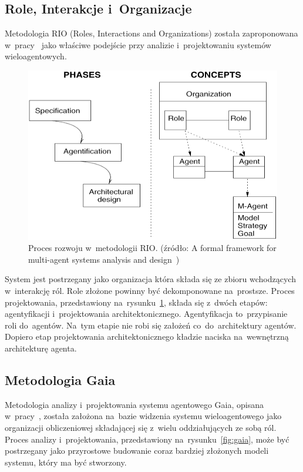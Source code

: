 \documentclass[11pt]{report}
\begin{document}
    \subsection{Role, Interakcje i~Organizacje}
    Metodologia RIO (Roles, Interactions and Organizations) została zaproponowana w~pracy~\cite{S095741740200070220020101} jako właściwe podejście przy analizie
    i~projektowaniu systemów wieloagentowych.

    \begin{figure}[!ht]
        \centering
        \includegraphics[width=\linewidth]{fig/RIO approach.png}
        \caption{Proces rozwoju w~metodologii RIO. (źródło: A formal framework for multi-agent systems analysis and design~\cite{S095741740200070220020101})}
        \label{fig:rio}
    \end{figure}

    System jest postrzegany jako organizacja która składa się ze zbioru wchodzących w~interakcję ról.
    Role złożone powinny być dekomponowane na~prostsze.
    Proces projektowania, przedstawiony na~rysunku~\ref{fig:rio}, składa się z~dwóch etapów: agentyfikacji i~projektowania architektonicznego.
    Agentyfikacja to~przypisanie roli do~agentów.
    Na~tym etapie nie robi się założeń co~do~architektury agentów.
    Dopiero etap projektowania architektonicznego kładzie naciska na~wewnętrzną architekturę agenta.

    \subsection{Metodologia Gaia}
    Metodologia analizy i~projektowania systemu agentowego Gaia, opisana w~pracy~\cite{Wooldridge2000a},
    została założona na~bazie widzenia systemu wieloagentowego jako organizacji obliczeniowej składającej się z~wielu oddziałujących ze sobą ról.
    Proces analizy i~projektowania, przedstawiony na~rysunku~\ref{fig:gaia}, może być postrzegany
    jako przyrostowe budowanie coraz bardziej złożonych modeli systemu, który ma być stworzony.
\end{document}
